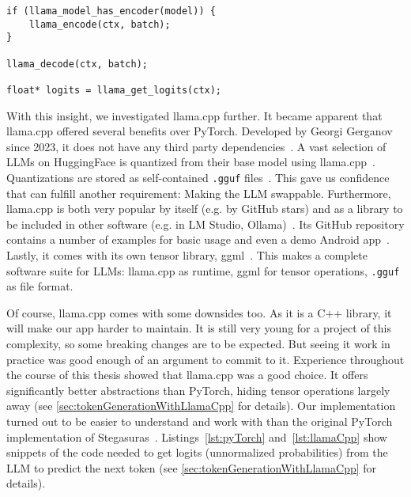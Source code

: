 \begin{lstlisting}[caption={[llama.cpp]{Snippet of our code needed to get logits from a \gls{LLM} using llama.cpp. No tensor operations are exposed.}}, label={lst:llamaCpp}]
if (llama_model_has_encoder(model)) {
	llama_encode(ctx, batch);
}

llama_decode(ctx, batch);

float* logits = llama_get_logits(ctx);
\end{lstlisting}

With this insight, we investigated llama.cpp further. It became apparent that llama.cpp offered several benefits over PyTorch. Developed by Georgi Gerganov since 2023, it does not have any third party dependencies~\cite{gerganovGgerganovLlamacpp2024}. A vast selection of \glspl{LLM} on HuggingFace is quantized from their base model using llama.cpp~\cite{huggingfaceModelsHuggingFace2025}. Quantizations are stored as self-contained \lstinline|.gguf| files~\cite{huggingfaceGGUF}. This gave us confidence that can fulfill another requirement: Making the \gls{LLM} swappable. Furthermore, llama.cpp is both very popular by itself (e.g. by GitHub stars) and as a library to be included in other software (e.g. in LM Studio, Ollama)~\cite{gerganovGgerganovLlamacpp2024}. Its GitHub repository contains a number of examples for basic usage and even a demo Android app~\cite{gerganovGgerganovLlamacpp2024}. Lastly, it comes with its own tensor library, ggml~\cite{gerganovGgerganovGgml2024}. This makes a complete software suite for \glspl{LLM}: llama.cpp as runtime, ggml for tensor operations, \lstinline|.gguf| as file format.

Of course, llama.cpp comes with some downsides too. As it is a C++ library, it will make our app harder to maintain. It is still very young for a project of this complexity, so some breaking changes are to be expected. But seeing it work in practice was good enough of an argument to commit to it. Experience throughout the course of this thesis showed that llama.cpp was a good choice. It offers significantly better abstractions than PyTorch, hiding tensor operations largely away (see \cref{sec:tokenGenerationWithLlamaCpp} for details). Our implementation turned out to be easier to understand and work with than the original PyTorch implementation of Stegasuras~\cite{zieglerHarvardnlpNeuralSteganography2025}. Listings~\ref{lst:pyTorch} and~\ref{lst:llamaCpp} show snippets of the code needed to get logits (unnormalized probabilities) from the \gls{LLM} to predict the next token (see \cref{sec:tokenGenerationWithLlamaCpp} for details).

